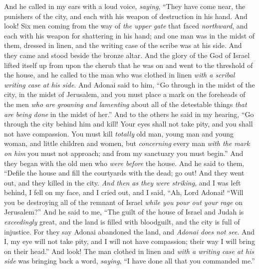 \begin{biblechapter} %
 And he called in my ears with a loud voice, \textit{saying}, “They have come near, the punishers of the city, and each with his weapon of destruction in his hand.
\verse And look! Six men coming from the way of \textit{the upper gate} that faced \textit{northward}, and each with his weapon for shattering in his hand; and one man was in the midst of them, dressed in linen, and the writing case of the scribe was at his side. And they came and stood beside the bronze altar.
\verse And the glory of the God of Israel lifted itself up from upon the cherub that he was on and went to the threshold of the house, and he called to the man who was clothed in linen \textit{with a scribal writing case at his side}.
\verse And Adonai said to him, “Go through in the midst of the city, in the midst of Jerusalem, and you must place a mark on the foreheads of the men \textit{who are groaning and lamenting} about all of the detestable things \textit{that are being done} in the midst of her.”
\verse And to the others he said in my hearing, “Go through the city behind him and kill! Your eyes shall not take pity, and you shall not have compassion.
\verse You must kill \textit{totally} old man, young man and young woman, and little children and women, but \textit{concerning} every man \textit{with the mark on him} you must not approach; and from my sanctuary you must begin.” And they began with the old men who \textit{were before} the house.
\verse And he said to them, “Defile the house and fill the courtyards with the dead; go out! And they went out, and they killed in the city.
\verse \textit{And then} \textit{as they were striking}, and I was left behind, I fell on my face, and I cried out, and I said, “Ah, Lord Adonai! “Will you be destroying all of the remnant of Israel \textit{while you pour out your rage} on Jerusalem?”
\verse And he said to me, “The guilt of the house of Israel and Judah is \textit{exceedingly} great, and the land is filled with bloodguilt, and the city is full of injustice. For they say Adonai abandoned the land, and \textit{Adonai does not see}.
\verse And I, my eye will not take pity, and I will not have compassion; their way I will bring on their head.”
\verse And look! The man clothed in linen and \textit{with a writing case at his side} was bringing back a word, \textit{saying}, “I have done all that you commanded me.”
\end{biblechapter}

